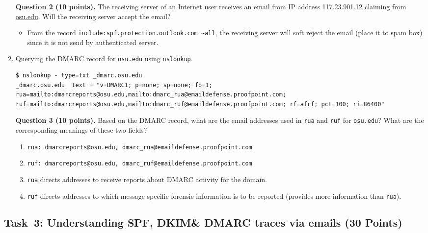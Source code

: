 \documentclass[11pt]{article}
\newcommand{\dmark}{{\sf DMARC}\xspace}
\newcommand{\dkim}{{\sf DKIM}\xspace}
\newcommand{\spf}{{\sf SPF}\xspace}
\begin{document}
\begin{enumerate}
\textbf{Question 2 (10 points).} The receiving server of an Internet user receives an email from IP address 117.23.901.12 claiming from \url{osu.edu}. Will the receiving server accept the email?

\begin{itemize}
  \item From the record \texttt{include:spf.protection.outlook.com \textasciitilde all}, the receiving server will soft reject the email (place it to spam box) since it is not send by authenticated server.
\end{itemize}

\item Querying the \dmark record for \texttt{osu.edu} using \texttt{nslookup}.
\begin{lstlisting}
$ nslookup - type=txt _dmarc.osu.edu
_dmarc.osu.edu  text = "v=DMARC1; p=none; sp=none; fo=1; rua=mailto:dmarcreports@osu.edu,mailto:dmarc_rua@emaildefense.proofpoint.com; ruf=mailto:dmarcreports@osu.edu,mailto:dmarc_ruf@emaildefense.proofpoint.com; rf=afrf; pct=100; ri=86400"
\end{lstlisting}\vspace{-6mm}

 \textbf{Question 3 (10 points).} Based on the \dmark record,  what are the email addresses used in \texttt{rua} and \texttt{ruf} for \texttt{osu.edu}?  What are the corresponding meanings of these two fields?

\begin{enumerate}
  \item \texttt{rua: dmarcreports@osu.edu, dmarc\_rua@emaildefense.proofpoint.com}
  \item \texttt{ruf: dmarcreports@osu.edu, dmarc\_ruf@emaildefense.proofpoint.com}
  \item \texttt{rua} directs addresses to receive reports about DMARC activity for the domain.
  \item \texttt{ruf} directs addresses to which message-specific forensic information is to be reported (provides more information than \texttt{rua}).
\end{enumerate}

\end{enumerate}


\subsection{Task~3: Understanding \spf, \dkim \& \dmark traces via emails (30 Points)}
\end{document}
